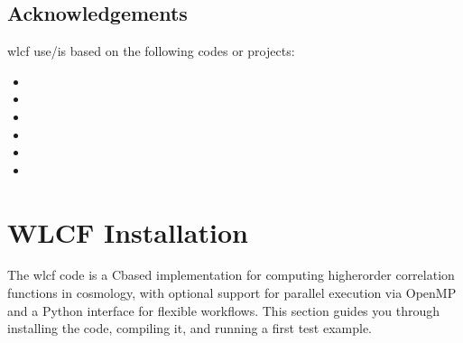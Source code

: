 \documentclass[letterpaper,10pt,english]{sphinxmanual}
\begin{document}
\sphinxAtStartPar
{}


\section{Acknowledgements}
\label{\detokenize{overview:acknowledgements}}
\sphinxAtStartPar
wlcf use/is based on the following codes or projects:
\begin{itemize}
\item {} 
\sphinxAtStartPar
{}

\item {} 
\sphinxAtStartPar
{}

\item {} 
\sphinxAtStartPar
{}

\item {} 
\sphinxAtStartPar
{}

\item {} 
\sphinxAtStartPar
{}

\item {} 
\sphinxAtStartPar
{}

\end{itemize}

\sphinxstepscope


\chapter{WLCF Installation}
\label{\detokenize{installation:wlcf-installation}}\label{\detokenize{installation::doc}}
\sphinxAtStartPar
The wlcf code is a C\sphinxhyphen{}based implementation for computing higher\sphinxhyphen{}order correlation functions in cosmology, with optional support for parallel execution via OpenMP and a Python interface for flexible workflows.
This section guides you through installing the code, compiling it, and running a first test example.
\end{document}
